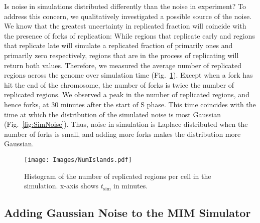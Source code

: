 		Is  noise in simulations distributed differently than the noise in experiment?
		To address this concern, we qualitatively investigated a possible source of the noise.
		We know that the greatest uncertainty in replicated fraction will coincide with the presence of forks of replication:
		While regions that replicate early and regions that replicate late will simulate a replicated fraction of primarily ones and primarily zero respectively, regions that are in the process of replicating will return both values.
		Therefore, we measured  the average number of replicated regions across the genome over simulation time (Fig.~\ref{fig:NumberIslands}).
		Except when a fork has hit the end of the chromosome, the number of forks is twice the number of replicated regions.
		We observed a peak in the number of replicated regions, and hence forks, at 30 minutes after the start of S phase.
		This time coincides with the time at which the distribution of the simulated noise is most Gaussian (Fig.~\ref{fig:SimNoise}).
		Thus, noise in simulation is Laplace distributed when the number of forks is small, and adding more forks makes the distribution more Gaussian.
		
		\begin{figure}[tbh]
			\begin{center}
				\texttt{[image: Images/NumIslands.pdf]}
			\end{center}
			\caption[Number of Replicated Regions in Simulation]{\label{fig:NumberIslands}
				Histogram of the number of replicated regions per cell in the simulation.
				x-axis shows $t_\text{sim}$ in minutes.
			}
		\end{figure}
		
		
		\subsection{Adding Gaussian Noise to the MIM Simulator}
		\label{subsec:AddingNoise}
		
